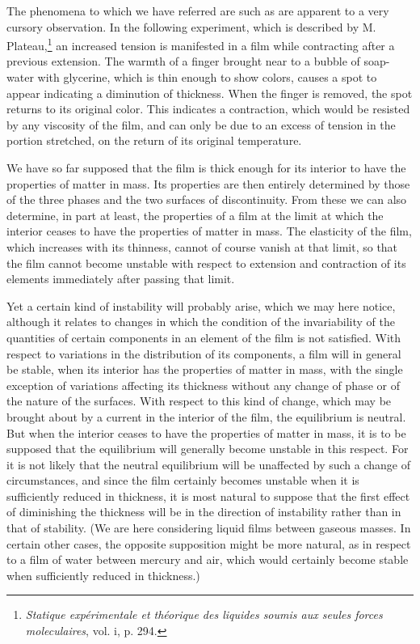 \documentclass[12pt]{article}
\begin{document}
The phenomena to which we have referred are such as are apparent to a very cursory observation. In the following experiment, which is described by M. Plateau,\footnote{\textit{Statique exp\'{e}rimentale et th\'{e}orique des liquides soumis aux seules forces moleculaires}, vol. i, p. 294.} an increased tension is manifested in a film while contracting after a previous extension. The warmth of a finger brought near to a bubble of soap-water with glycerine, which is thin enough to show colors, causes a spot to appear indicating a diminution of thickness. When the finger is removed, the spot returns to its original color.  This indicates a contraction, which would be resisted by any viscosity of the film, and can only be due to an excess of tension in the portion stretched, on the return of its original temperature.

We have so far supposed that the film is thick enough for its interior to have the properties of matter in mass. Its properties are then entirely determined by those of the three phases and the two surfaces of discontinuity. From these we can also determine, in part at least, the properties of a film at the limit at which the interior ceases to have the properties of matter in mass. The elasticity of the film, which increases with its thinness, cannot of course vanish at that limit, so that the film cannot become unstable with respect to extension and contraction of its elements immediately after passing that limit.

Yet a certain kind of instability will probably arise, which we may here notice, although it relates to changes in which the condition of the invariability of the quantities of certain components in an element of the film is not satisfied. With respect to variations in the distribution of its components, a film will in general be stable, when its interior has the properties of matter in mass, with the single exception of variations affecting its thickness without any change of phase or of the nature of the surfaces. With respect to this kind of change, which may be brought about by a current in the interior of the film, the equilibrium is neutral. But when the interior ceases to have the properties of matter in mass, it is to be supposed that the equilibrium will generally become unstable in this respect. For it is not likely that the neutral equilibrium will be unaffected by such a change of circumstances, and since the film certainly becomes unstable when it is sufficiently reduced in thickness, it is most natural to suppose that the first effect of diminishing the thickness will be in the direction of instability rather than in that of stability. (We are here considering liquid films between gaseous masses. In certain other cases, the opposite supposition might be more natural, as in respect to a film of water between mercury and air, which would certainly become stable when sufficiently reduced in thickness.)
\end{document}
